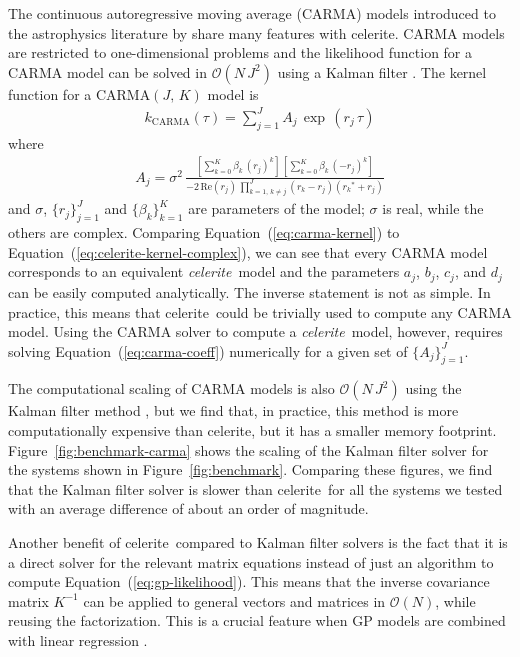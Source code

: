 \documentclass[manuscript, letterpaper]{aastex6}
\newcommand{\project}[1]{\textsf{#1}}
\newcommand{\celerite}{\project{celerite}}
\newcommand{\celeriteterm}{\emph{celerite}}
\newcommand{\figureref}[1]{\ref{fig:#1}}
\newcommand{\Figure}[1]{Figure~\figureref{#1}}
\renewcommand{\eqref}[1]{\ref{eq:#1}}
\newcommand{\Eq}[1]{Equation~(\eqref{#1})}
\newcommand{\eq}[1]{\Eq{#1}}
\newcommand{\eqlabel}[1]{\label{eq:#1}}
\newcommand{\response}[1]{{\color{blue}#1}}
\begin{document}
The continuous autoregressive moving average (CARMA) models introduced to the
astrophysics literature by \citet{Kelly:2014} share many features with
\celerite.
CARMA models are restricted to one-dimensional problems and the likelihood
function for a CARMA model can be solved in $\mathcal{O}(N\,J^2)$ using a
Kalman filter \citep{Kelly:2014}.
The kernel function for a CARMA$(J,\,K)$ model is
\begin{eqnarray}\eqlabel{carma-kernel}
k_\mathrm{CARMA}(\tau) = \sum_{j=1}^J A_j\,\exp\,(r_j\,\tau)
\end{eqnarray}
where
\begin{eqnarray}\eqlabel{carma-coeff}
A_j = \sigma^2 \,\frac{\left[\sum_{k=0}^K\beta_k\,{(r_j)}^k\right]\,
    \left[\sum_{k=0}^K\beta_k\,{(-r_j)}^k\right]}
    {-2\,\mathrm{Re}(r_j)\,\prod_{k=1,\,k \ne j}^{J}(r_k-r_j)({r_k}^*+r_j)}
\end{eqnarray}
and $\sigma$, $\{r_j\}_{j=1}^J$ and $\{\beta_k\}_{k=1}^K$ are parameters of
the model; $\sigma$ is real, while the others are complex.
Comparing \eq{carma-kernel} to \eq{celerite-kernel-complex}, we can see that
every CARMA model corresponds to an equivalent \celeriteterm\ model and the
parameters $a_j$, $b_j$, $c_j$, and $d_j$ can be easily computed analytically.
The inverse statement is not as simple.
In practice, this means that \celerite\ could be trivially used to compute any
CARMA model.
Using the CARMA solver to compute a \celeriteterm\ model, however, requires
solving \eq{carma-coeff} numerically for a given set of $\{A_j\}_{j=1}^J$.

\response{
The computational scaling of CARMA models is also $\mathcal{O}(N\,J^2)$ using
the Kalman filter method \citep{Kelly:2014}, but we find that, in practice,
this method is more computationally expensive than \celerite, but it has a
smaller memory footprint.
\Figure{benchmark-carma} shows the scaling of the Kalman filter solver for the
systems shown in \Figure{benchmark}.
Comparing these figures, we find that the Kalman filter solver is slower than
\celerite\ for all the systems we tested with an average difference of about
an order of magnitude.

Another benefit of \celerite\ compared to Kalman filter solvers is the fact
that it is a direct solver for the relevant matrix equations instead of just
an algorithm to compute \eq{gp-likelihood}.
This means that the inverse covariance matrix $K^{-1}$ can be applied to
general vectors and matrices in $\mathcal{O}(N)$, while reusing the
factorization.
This is a crucial feature when GP models are combined with linear regression
\citep[for example][]{Luger:2017}.
}
\end{document}
